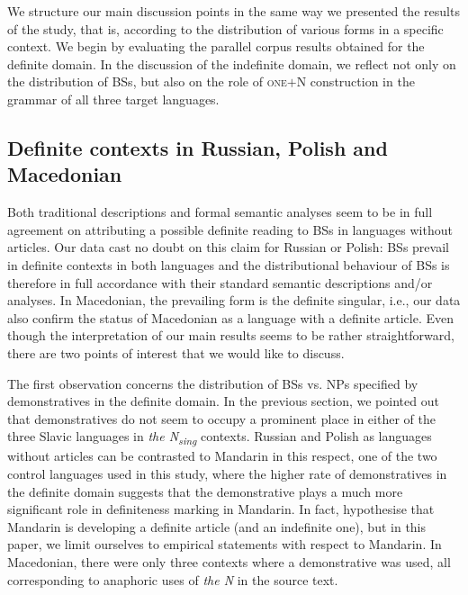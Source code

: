 \documentclass[output=paper,colorlinks,citecolor=brown]{langscibook}
\begin{document}
We structure our main discussion points in the same way we presented the results of the study, that is, according to the distribution of various forms in a specific context. We begin by evaluating the parallel corpus results obtained for the definite domain. In the discussion of the indefinite domain, we reflect not only on the distribution of BSs, but also on the role of \textsc{one}$+$N construction in the grammar of all three target languages. 

\subsection {Definite contexts in Russian, Polish and Macedonian} \label{Def discussion}

Both traditional descriptions and formal semantic analyses seem to be in full agreement on attributing a possible definite reading to BSs in languages without articles. Our data cast no doubt on this claim for Russian or Polish: BSs prevail in definite contexts in both languages and the distributional behaviour of BSs is therefore in full accordance with their standard semantic descriptions and/or analyses. In Macedonian, the prevailing form is the definite singular, i.e., our data also confirm the status of Macedonian as a language with a definite article. Even though the interpretation of our main results seems to be rather straightforward, there are two points of interest that we would like to discuss. 

The first observation concerns the distribution of BSs vs. NPs specified by demonstratives in the definite domain. In the previous section, we pointed out that demonstratives do not seem to occupy a prominent place in either of the three Slavic languages in \textit{the N{\textsubscript{sing}}} contexts. Russian and Polish as languages without articles can be contrasted to Mandarin in this respect, one of the two control languages used in this study, where the higher rate of demonstratives in the definite domain suggests that the demonstrative plays a much more significant role in definiteness marking in Mandarin. In fact, \citet{Liuetal2022} hypothesise that Mandarin is developing a definite article (and an indefinite one), but in this paper, we limit ourselves to empirical statements with respect to Mandarin.
In Macedonian, there were only three contexts where a demonstrative was used, all corresponding to anaphoric uses of \textit{the N} in the source text. 
\end{document}
